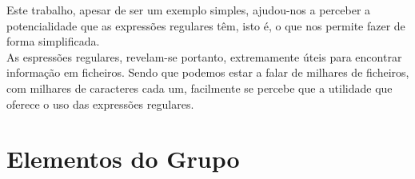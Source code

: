 \documentclass[a4paper,11pt,openright,openbib]{report}
\begin{document}
Este trabalho, apesar de ser um exemplo simples, ajudou-nos a perceber a potencialidade que as expressões regulares têm, isto é, o que nos permite fazer de forma simplificada.\\
As espressões regulares, revelam-se portanto, extremamente úteis para encontrar informação em ficheiros. Sendo que podemos estar a falar de milhares de ficheiros, com milhares de caracteres cada um, facilmente se percebe que a utilidade que oferece o uso das expressões regulares.\\

\label{c:conclusao}

\clearpage
\section{Elementos do Grupo}
\end{document}

